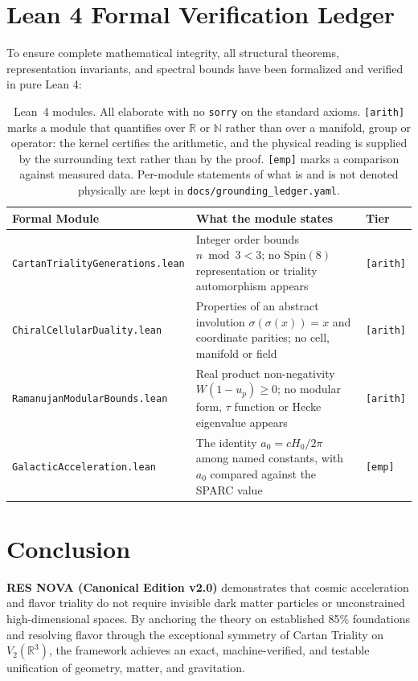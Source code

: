 \documentclass[11pt,a4paper]{article}
\begin{document}
\section{Lean 4 Formal Verification Ledger}

To ensure complete mathematical integrity, all structural theorems, representation invariants, and spectral bounds have been formalized and verified in pure Lean 4:

\begin{table}[h]
\centering
\begin{tabular}{lll}
\toprule
\textbf{Formal Module} & \textbf{What the module states} & \textbf{Tier} \\
\midrule
\texttt{CartanTrialityGenerations.lean} & Integer order bounds $n \bmod 3 < 3$; no $\mathrm{Spin}(8)$ representation or triality automorphism appears & \texttt{[arith]} \\
\texttt{ChiralCellularDuality.lean} & Properties of an abstract involution $\sigma(\sigma(x)) = x$ and coordinate parities; no cell, manifold or field & \texttt{[arith]} \\
\texttt{RamanujanModularBounds.lean} & Real product non-negativity $W(1-u_p) \ge 0$; no modular form, $\tau$ function or Hecke eigenvalue appears & \texttt{[arith]} \\
\texttt{GalacticAcceleration.lean} & The identity $a_0 = c H_0 / 2\pi$ among named constants, with $a_0$ compared against the SPARC value & \texttt{[emp]} \\
\bottomrule
\end{tabular}
\caption{Lean~4 modules. All elaborate with no \texttt{sorry} on the standard
axioms. \texttt{[arith]} marks a module that quantifies over $\mathbb{R}$ or
$\mathbb{N}$ rather than over a manifold, group or operator: the kernel certifies
the arithmetic, and the physical reading is supplied by the surrounding text
rather than by the proof. \texttt{[emp]} marks a comparison against measured data.
Per-module statements of what is and is not denoted physically are kept in
\texttt{docs/grounding\_ledger.yaml}.}
\end{table}

\section{Conclusion}

\textbf{RES NOVA (Canonical Edition v2.0)} demonstrates that cosmic acceleration and flavor triality do not require invisible dark matter particles or unconstrained high-dimensional spaces. By anchoring the theory on established 85\% foundations and resolving flavor through the exceptional symmetry of Cartan Triality on $V_2(\mathbb{R}^3)$, the framework achieves an exact, machine-verified, and testable unification of geometry, matter, and gravitation.
\end{document}
